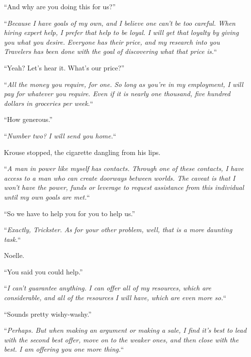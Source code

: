 ``And why are you doing this for us?''



``\emph{Because I have goals of my own, and I believe one can't be too careful.  When hiring expert help, I prefer that help to be loyal.  I will get that loyalty by giving you what you desire.  Everyone has their price, and my research into you Travelers has been done with the goal of discovering what that price is.}``



``Yeah?  Let's hear it.  What's our price?''



``\emph{All the money you require, for one.  So long as you're in my employment, I will pay for whatever you require.  Even if it is nearly one thousand, five hundred dollars in groceries per week.}``



``How generous.''



``\emph{Number two?  I will send you home.}``



Krouse stopped, the cigarette dangling from his lips.



``\emph{A man in power like myself has contacts.  Through one of these contacts, I have access to a man who can create doorways between worlds.  The caveat is that I won't have the power, funds or leverage to request assistance from this individual until my own goals are met.}``



``So we have to help you for you to help us.''



``\emph{Exactly, Trickster.  As for your other problem, well, that is a more daunting task.}``



Noelle.



``You said you could help.''



``\emph{I can't guarantee anything.  I can offer all of my resources, which are considerable, and all of the resources I will have, which are even more so.}``



``Sounds pretty wishy-washy.''



``\emph{Perhaps.  But when making an argument or making a sale, I find it's best to lead with the second best offer, move on to the weaker ones, and then close with the best.  I am offering you one more thing.}``



